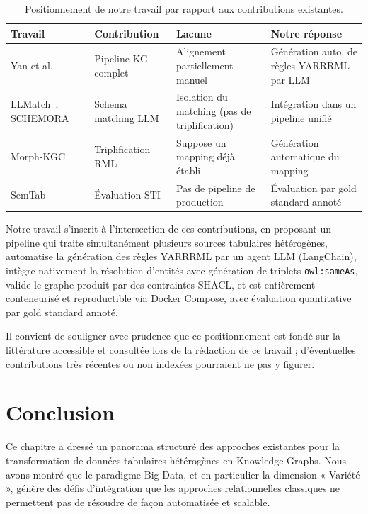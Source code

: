 \begin{table}[ht]
\centering

\label{tab:positionnement}
\begin{tabular}{|p{3cm}|p{3.5cm}|p{3.5cm}|p{3cm}|}
\hline
\textbf{Travail} & \textbf{Contribution} & \textbf{Lacune} & \textbf{Notre réponse} \\
\hline
Yan et al.~\cite{yan2023enterprise} & Pipeline KG complet & Alignement partiellement manuel & Génération auto. de règles YARRRML par LLM \\
\hline
LLMatch~\cite{llmatch2025}, SCHEMORA~\cite{schemora2025} & Schema matching LLM & Isolation du matching (pas de triplification) & Intégration dans un pipeline unifié \\
\hline
Morph-KGC~\cite{arenas2023morphkgc} & Triplification RML & Suppose un mapping déjà établi & Génération automatique du mapping \\
\hline
SemTab~\cite{semtab2024} & Évaluation STI & Pas de pipeline de production & Évaluation par gold standard annoté \\
\hline
\end{tabular}
\caption{Positionnement de notre travail par rapport aux contributions existantes.}
\end{table}

Notre travail s'inscrit à l'intersection de ces contributions, en proposant un pipeline qui traite simultanément plusieurs sources tabulaires hétérogènes, automatise la génération des règles YARRRML par un agent LLM (LangChain), intègre nativement la résolution d'entités avec génération de triplets \texttt{owl:sameAs}, valide le graphe produit par des contraintes SHACL, et est entièrement conteneurisé et reproductible via Docker Compose, avec évaluation quantitative par gold standard annoté.

Il convient de souligner avec prudence que ce positionnement est fondé sur la littérature accessible et consultée lors de la rédaction de ce travail ; d'éventuelles contributions très récentes ou non indexées pourraient ne pas y figurer.

\section{Conclusion}\label{sec:conclusion_etat_art}
Ce chapitre a dressé un panorama structuré des approches existantes pour la transformation de données tabulaires hétérogènes en Knowledge Graphs. Nous avons montré que le paradigme Big Data, et en particulier la dimension « Variété », génère des défis d'intégration que les approches relationnelles classiques ne permettent pas de résoudre de façon automatisée et scalable.

